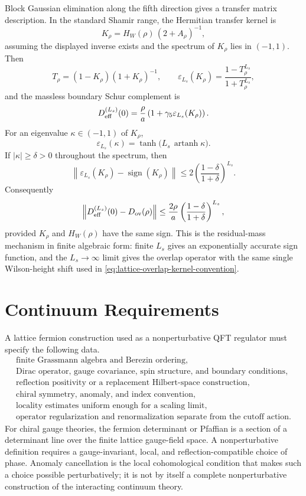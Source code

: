 Block Gaussian elimination along the fifth direction gives a transfer matrix
description.  In the standard Shamir range, the Hermitian transfer kernel is
\[
  K_\rho=H_W(\rho)\,(2+A_\rho)^{-1},
\]
assuming the displayed inverse exists and the spectrum of \(K_\rho\) lies in
\((-1,1)\).  Then
\[
  T_\rho=(1-K_\rho)(1+K_\rho)^{-1},
  \qquad
  \varepsilon_{L_s}(K_\rho)
  =
  \frac{1-T_\rho^{L_s}}{1+T_\rho^{L_s}},
\]
and the massless boundary Schur complement is
\begin{equation}
  D_{\rm eff}^{(L_s)}(0)
  =
  \frac{\rho}{a}
  \left(1+\gamma_5\varepsilon_{L_s}(K_\rho)\right).
  \label{eq:domain-wall-finite-ls-effective-overlap}
\end{equation}
For an eigenvalue \(\kappa\in(-1,1)\) of \(K_\rho\),
\[
  \varepsilon_{L_s}(\kappa)
  =
  \tanh\bigl(L_s\,\operatorname{artanh}\kappa\bigr).
\]
If \(|\kappa|\geq\delta>0\) throughout the spectrum, then
\[
  \left\|
    \varepsilon_{L_s}(K_\rho)-\operatorname{sign}(K_\rho)
  \right\|
  \leq
  2\left(\frac{1-\delta}{1+\delta}\right)^{L_s}.
\]
Consequently
\[
  \left\|
    D_{\rm eff}^{(L_s)}(0)-D_{\rm ov}(\rho)
  \right\|
  \leq
  \frac{2\rho}{a}
  \left(\frac{1-\delta}{1+\delta}\right)^{L_s},
\]
provided \(K_\rho\) and \(H_W(\rho)\) have the same sign.  This is the
residual-mass mechanism in finite algebraic form: finite \(L_s\) gives an
exponentially accurate sign function, and the \(L_s\to\infty\) limit gives the
overlap operator with the same single Wilson-height shift used in
\eqref{eq:lattice-overlap-kernel-convention}.

\section{Continuum Requirements}

A lattice fermion construction used as a nonperturbative QFT regulator must
specify the following data.
\[
\begin{gathered}
  \text{finite Grassmann algebra and Berezin ordering},\\
  \text{Dirac operator, gauge covariance, spin structure, and boundary
  conditions},\\
  \text{reflection positivity or a replacement Hilbert-space construction},\\
  \text{chiral symmetry, anomaly, and index convention},\\
  \text{locality estimates uniform enough for a scaling limit},\\
  \text{operator regularization and renormalization separate from the
  cutoff action}.
\end{gathered}
\]
For chiral gauge theories, the fermion determinant or Pfaffian is a section
of a determinant line over the finite lattice gauge-field space.  A
nonperturbative definition requires a gauge-invariant, local, and
reflection-compatible choice of phase.  Anomaly cancellation is the local
cohomological condition that makes such a choice possible perturbatively; it
is not by itself a complete nonperturbative construction of the interacting
continuum theory.

